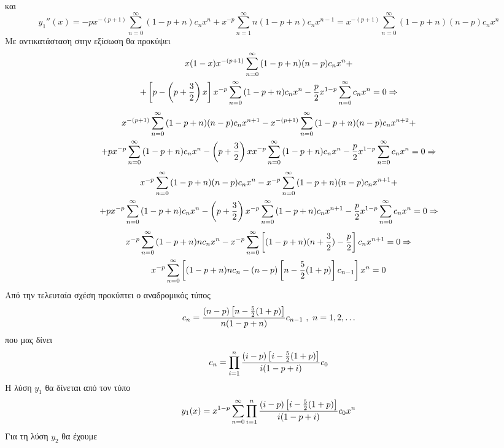 \documentclass[a4paper,twoside,11pt]{book}
\DeclareRobustCommand{\frac}[3][0pt]{%
{\begingroup\hspace{#1}#2\hspace{#1}\endgroup\over\hspace{#1}#3\hspace{#1}}}
\begin{document}
και
\[ y_1''(x)=-px^{-(p+1)}\sum_{n=0}^{\infty}{(1-p+n)c_nx^n}+x^{-p}\sum_{n=1}^{\infty}{n(1-p+n)c_nx^{n-1}}=x^{-(p+1)}\sum_{n=0}^{\infty}{(1-p+n)(n-p)c_nx^n} \]
Με αντικατάσταση στην εξίσωση θα προκύψει
\begin{multline*}
x(1-x)x^{-(p+1)}\sum_{n=0}^{\infty}{(1-p+n)(n-p)c_nx^n}+\\+\left[p-\left(p+\frac{3}{2}\right)x\right]x^{-p}\sum_{n=0}^{\infty}{(1-p+n)c_nx^n}-\frac{p}{2}x^{1-p}\sum_{n=0}^{\infty}{c_nx^n}=0\Rightarrow
\end{multline*}
\vspace{-7mm}
\begin{multline*}
x^{-(p+1)}\sum_{n=0}^{\infty}{(1-p+n)(n-p)c_nx^{n+1}}-x^{-(p+1)}\sum_{n=0}^{\infty}{(1-p+n)(n-p)c_nx^{n+2}}+\\+px^{-p}\sum_{n=0}^{\infty}{(1-p+n)c_nx^n}-\left(p+\frac{3}{2}\right)xx^{-p}\sum_{n=0}^{\infty}{(1-p+n)c_nx^n}-\frac{p}{2}x^{1-p}\sum_{n=0}^{\infty}{c_nx^n}=0\Rightarrow
\end{multline*}
\vspace{-7mm}
\begin{multline*}
x^{-p}\sum_{n=0}^{\infty}{(1-p+n)(n-p)c_nx^{n}}-x^{-p}\sum_{n=0}^{\infty}{(1-p+n)(n-p)c_nx^{n+1}}+\\+px^{-p}\sum_{n=0}^{\infty}{(1-p+n)c_nx^n}-\left(p+\frac{3}{2}\right)x^{-p}\sum_{n=0}^{\infty}{(1-p+n)c_nx^{n+1}}-\frac{p}{2}x^{1-p}\sum_{n=0}^{\infty}{c_nx^n}=0\Rightarrow
\end{multline*}
\vspace{-7mm}
\begin{gather*}
x^{-p}\sum_{n=0}^{\infty}{(1-p+n)nc_nx^{n}}-x^{-p}\sum_{n=0}^{\infty}{\left[(1-p+n)(n+\frac{3}{2})-\frac{p}{2}\right]c_nx^{n+1}}=0\Rightarrow\\
x^{-p}\sum_{n=0}^{\infty}{\left[(1-p+n)nc_n-(n-p)\left[n-\frac{5}{2}(1+p)\right]c_{n-1}\right]x^n}=0
\end{gather*}
Από την τελευταία σχέση προκύπτει ο αναδρομικός τύπος
\[ c_n=\frac{(n-p)\left[n-\frac{5}{2}(1+p)\right]}{n(1-p+n)}c_{n-1}\ ,\ n=1,2,\ldots \]
που μας δίνει
\[ c_n=\prod_{i=1}^{n}\frac{(i-p)\left[i-\frac{5}{2}(1+p)\right]}{i(1-p+i)}c_0 \]
Η λύση $ y_1 $ θα δίνεται από τον τύπο 
\[ y_1(x)=x^{1-p}\sum_{n=0}^{\infty}{\prod_{i=1}^{n}\frac{(i-p)\left[i-\frac{5}{2}(1+p)\right]}{i(1-p+i)}c_0}x^n \]
Για τη λύση $ y_2 $ θα έχουμε
\end{document}

